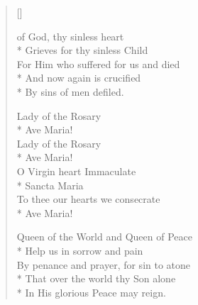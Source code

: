 \newHymn

\begin{verse}[\versewidth]

 of God, thy sinless heart\\*
Grieves for thy sinless Child\\
For Him who suffered for us and died\\*
And now again is crucified\\*
By sins of men defiled.

\begin{indentedVerse}
\begin{altverse}
\vin Lady of the Rosary\\*
\vin Ave Maria!\\
\vin Lady of the Rosary\\*
\vin Ave Maria!\\
\vin O Virgin heart Immaculate\\*
\vin Sancta Maria\\
\vin To thee our hearts we consecrate\\*
\vin Ave Maria!
\end{altverse}
\end{indentedVerse}

Queen of the World and Queen of Peace\\*
Help us in sorrow and pain\\
By penance and prayer, for sin to atone\\*
That over the world thy Son alone\\*
In His glorious Peace may reign.

\end{verse}

